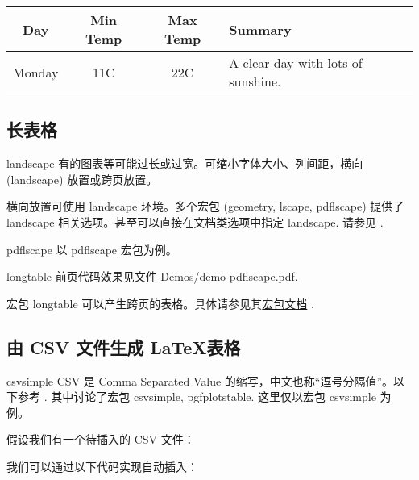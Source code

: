 \documentclass[final]{ctexbeamer}
\begin{document}
\begin{frame}[fragile]
\begin{vertlst}
\begin{tabular}{ *{3}{| c} | p{3.5cm} |}
\hline
Day & Min Temp & Max Temp & Summary \\ \hline
Monday & 11C & 22C & A clear day with lots of sunshine. \\ \hline
\end{tabular}
\end{vertlst}
\end{frame}


\subsection{长表格}
\begin{frame}[fragile]{landscape}
有的图表等可能过长或过宽。可缩小字体大小、列间距，横向 (landscape) 放置或跨页放置。

横向放置可使用 landscape 环境。多个宏包 (geometry, lscape, pdflscape) 提供了 landscape 相关选项。甚至可以直接在文档类选项中指定 landscape. 请参见 \cite{texblog-table}.
\end{frame}

\begin{frame}[fragile]{pdflscape}
以 pdflscape 宏包为例。
\end{frame}


\begin{frame}{longtable}
前页代码效果见文件 \href{run:Demos/demo-pdflscape.pdf}{Demos/demo-pdflscape.pdf}.

宏包 longtable 可以产生跨页的表格。具体请参见其\href{http://mirrors.ctan.org/macros/latex/required/tools/longtable.pdf}{宏包文档} \cite{longtable}.
\end{frame}

\subsection[CSV to LaTeX tables]{由 CSV 文件生成 \LaTeX 表格}
\begin{frame}[fragile]{csvsimple}
CSV 是 Comma Separated Value 的缩写，中文也称“逗号分隔值”。以下参考 \cite{texblog-csv}. 其中讨论了宏包 csvsimple, pgfplotstable. 这里仅以宏包 csvsimple 为例。

假设我们有一个待插入的 CSV 文件：
\end{frame}

\begin{frame}[fragile]
我们可以通过以下代码实现自动插入：
\begin{sidelst}

\end{sidelst}
\end{frame}
\end{document}
